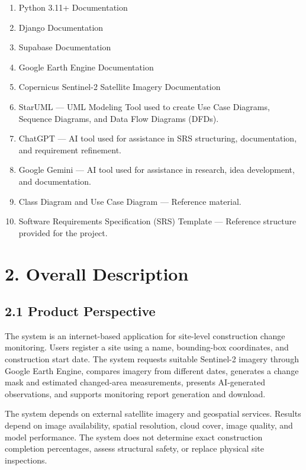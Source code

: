 \documentclass[12pt,a4paper]{report}
\newcommand{\chapterlabel}{}
\begin{document}
\begin{enumerate}
\def\labelenumi{\arabic{enumi}.}
\item
  Python 3.11+ Documentation
\item
  Django Documentation
\item
  Supabase Documentation
\item
  Google Earth Engine Documentation
\item
  Copernicus Sentinel-2 Satellite Imagery Documentation
\item
  StarUML --- UML Modeling Tool used to create Use Case Diagrams,
  Sequence Diagrams, and Data Flow Diagrams (DFDs).
\item
  ChatGPT --- AI tool used for assistance in SRS structuring,
  documentation, and requirement refinement.
\item
  Google Gemini --- AI tool used for assistance in research, idea
  development, and documentation.
\item
  Class Diagram and Use Case Diagram --- Reference material.
\item
  Software Requirements Specification (SRS) Template --- Reference
  structure provided for the project.
\end{enumerate}

\renewcommand{\chapterlabel}{Chapter 2}
\chapter{2. Overall Description}\label{overall-description}

\section{2.1 Product Perspective}\label{product-perspective}

The system is an internet-based application for site-level construction
change monitoring. Users register a site using a name, bounding-box
coordinates, and construction start date. The system requests suitable
Sentinel-2 imagery through Google Earth Engine, compares imagery from
different dates, generates a change mask and estimated changed-area
measurements, presents AI-generated observations, and supports
monitoring report generation and download.

The system depends on external satellite imagery and geospatial
services. Results depend on image availability, spatial resolution,
cloud cover, image quality, and model performance. The system does not
determine exact construction completion percentages, assess structural
safety, or replace physical site inspections.
\end{document}
